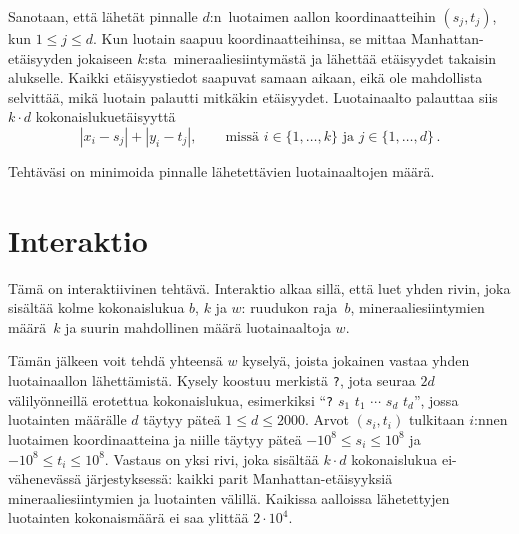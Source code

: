 Sanotaan, että lähetät pinnalle $d$:n~luotaimen aallon koordinaatteihin $(s_j, t_j)$, kun $1\leq j\leq d$.
Kun luotain saapuu koordinaatteihinsa, se mittaa Manhattan-etäisyyden jokaiseen $k$:sta~mineraaliesiintymästä ja lähettää etäisyydet takaisin alukselle.
Kaikki etäisyystiedot saapuvat samaan aikaan, eikä ole mahdollista selvittää, mikä luotain palautti mitkäkin etäisyydet.
Luotainaalto palauttaa siis $k \cdot d$ kokonaislukuetäisyyttä
\[|x_i-s_j| + |y_i - t_j|, \qquad\text{missä } i \in \{1,\ldots,k\} \text{ ja } j \in\{ 1,\ldots,d\}\,.\]

Tehtäväsi on minimoida pinnalle lähetettävien luotainaaltojen määrä.

\section*{Interaktio}

Tämä on interaktiivinen tehtävä.
Interaktio alkaa sillä, että luet yhden rivin, joka sisältää kolme kokonaislukua $b$, $k$ ja $w$:
ruudukon raja~$b$,
mineraaliesiintymien määrä~$k$
ja suurin mahdollinen määrä luotainaaltoja $w$.

Tämän jälkeen voit tehdä yhteensä $w$ kyselyä, joista jokainen vastaa yhden luotainaallon lähettämistä.
Kysely koostuu merkistä \texttt{?}, jota seuraa $2d$ välilyönneillä erotettua kokonaislukua,
esimerkiksi ``\texttt{?} $s_1$ $t_1$ $\cdots$ $s_d$ $t_d$'',
jossa luotainten määrälle $d$ täytyy päteä
$1\leq d\leq 2000$. %
Arvot $(s_i,t_i)$ tulkitaan $i$:nnen luotaimen koordinaatteina ja niille täytyy päteä
$-10^8 \leq s_i \leq 10^8$ ja $-10^8 \leq t_i \leq 10^8$. %
Vastaus on yksi rivi, joka sisältää $k \cdot d$ kokonaislukua
ei-vähenevässä järjestyksessä: %
kaikki parit Manhattan-etäisyyksiä mineraaliesiintymien ja luotainten välillä.
Kaikissa aalloissa lähetettyjen luotainten kokonaismäärä ei saa ylittää
$2\cdot 10^4.$ %

